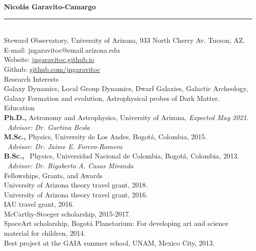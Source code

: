 \documentclass[UTF8]{article}
\begin{document}
\indent \textbf{\LARGE Nicol\'as Garavito-Camargo}\\
\indent \rule{17cm}{0.4pt}\\

\indent\indent Steward Observatory, University of Arizona, 933 North Cherry Av. Tucson, AZ.\\
\indent\indent E-mail: jngaravitoc@email.arizona.edu\\ 
\indent\indent Website: \href{http://jngaravitoc.github.io/Garavito-Camargo}{jngaravitoc.github.io}\\
\indent\indent Github: \href{http://www.github.com/jngaravitoc}{github.com/jngaravitoc} \\

{\Large Research Interests}\\

\indent\indent Galaxy Dynamics, Local Group Dynamics, Dwarf Galaxies, Galactic
Archeology, Galaxy Formation and evolution, 
\indent\indent Astrophysical probes of Dark
Matter.\\


{\Large Education}\\


\indent\indent \textbf{Ph.D.,} Astronomy and Astrophysics, University of
Arizona, \textit{Expected May 2021}.\\
\indent\indent\indent\indent \ \textit{Advisor: Dr. Gurtina Besla}\\

\indent\indent\textbf{M.Sc.,}  Physics, University de Los Andes, Bogot\'a, Colombia, 2015.\\
\indent\indent\indent\indent \ \textit{Advisor: Dr. Jaime E. Forero-Romero}\\

\indent\indent\textbf{B.Sc.,} \  Physics, Universidad Nacional de Colombia, Bogot\'a, Colombia, 2013.\\
\indent\indent\indent\indent \ \textit{Advisor: Dr. Rigoberto A. Casas Miranda}\\

{\Large{Fellowships, Grants, and Awards}}\\

\indent\indent University of Arizona theory travel grant, 2018. \\
\indent\indent University of Arizona theory travel grant, 2016. \\
\indent\indent IAU travel grant, 2016.\\
\indent\indent McCarthy-Stoeger scholarship, 2015-2017.\\
\indent\indent SpaceArt scholarship, Bogot\'a Planetarium: For developing art and science material for children, 2014. \\
\indent\indent Best project at the GAIA summer school, UNAM, Mexico City, 2013.\\
\end{document}
